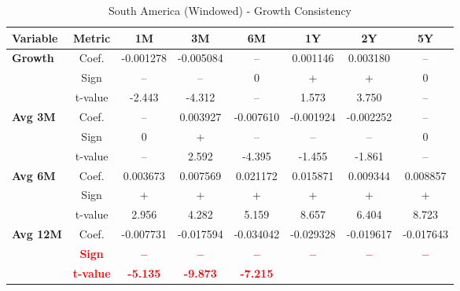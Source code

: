 \documentclass[11pt,english,a4paper,hidelinks]{book}
\begin{document}
\begin{table}[H]
    \centering
    \caption{South America (Windowed) - Growth Consistency}
    \begin{tabular}{lccccccc}
        \toprule
        \textbf{Variable} & \textbf{Metric} & \textbf{1M} & \textbf{3M} & \textbf{6M} & \textbf{1Y} & \textbf{2Y} & \textbf{5Y} \\
        \midrule
        \multirow{3}{*}{\textbf{Growth}}
            & Coef.   & -0.001278 & -0.005084 & --        & 0.001146  & 0.003180  & --        \\
            & Sign    & –         & –         & 0         & +         & +         & 0         \\
            & t-value & -2.443    & -4.312    & --        & 1.573     & 3.750     & --        \\
        \cmidrule{1-8}
        \multirow{3}{*}{\textbf{Avg 3M}}
            & Coef.   & --        & 0.003927  & -0.007610 & -0.001924 & -0.002252 & --        \\
            & Sign    & 0         & +         & –         & –         & –         & 0         \\
            & t-value & --        & 2.592     & -4.395    & -1.455    & -1.861    & --        \\
        \cmidrule{1-8}
        \multirow{3}{*}{\textbf{Avg 6M}}
            & Coef.   & 0.003673  & 0.007569  & 0.021172  & 0.015871  & 0.009344  & 0.008857  \\
            & Sign    & +         & +         & +         & +         & +         & +         \\
            & t-value & 2.956     & 4.282     & 5.159     & 8.657     & 6.404     & 8.723     \\
        \cmidrule{1-8}
        \multirow{3}{*}{\textbf{Avg 12M}}
            & Coef.   & -0.007731 & -0.017594 & -0.034042 & -0.029328 & -0.019617 & -0.017643 \\
            & \textbf{\textcolor{red}{Sign}}
                     & \textbf{\textcolor{red}{–}}
                     & \textbf{\textcolor{red}{–}}
                     & \textbf{\textcolor{red}{–}}
                     & \textbf{\textcolor{red}{–}}
                     & \textbf{\textcolor{red}{–}}
                     & \textbf{\textcolor{red}{–}} \\
            & \textbf{\textcolor{red}{t-value}}
                     & \textbf{\textcolor{red}{-5.135}}
                     & \textbf{\textcolor{red}{-9.873}}
                     & \textbf{\textcolor{red}{-7.215}}

\end{tabular}
\end{table}
\end{document}
